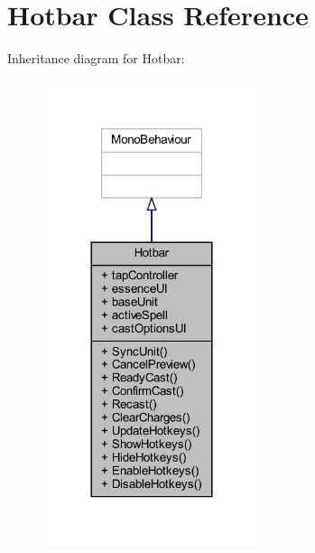 \hypertarget{class_hotbar}{}\section{Hotbar Class Reference}
\label{class_hotbar}


Inheritance diagram for Hotbar\+:\nopagebreak
\begin{figure}[H]
\begin{center}
\leavevmode
\includegraphics[width=180pt]{class_hotbar__inherit__graph}
\end{center}
\end{figure}


